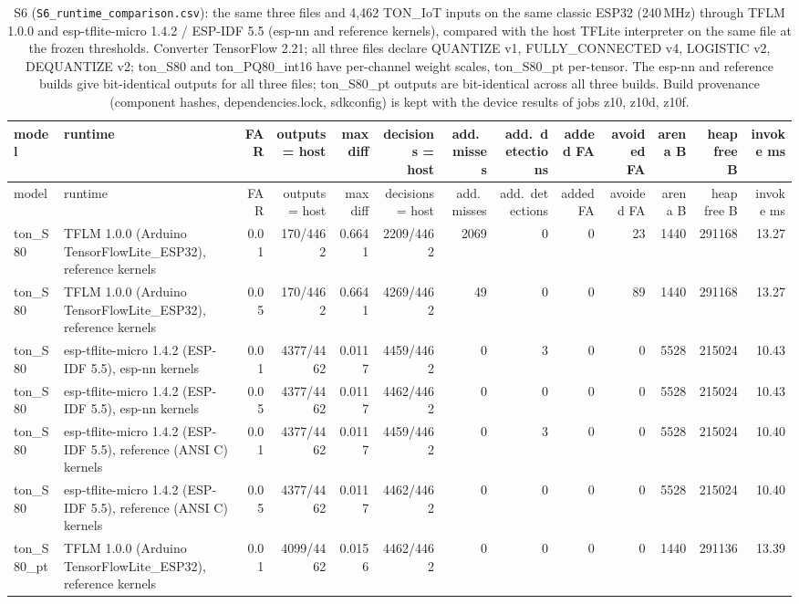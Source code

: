 \documentclass[10pt]{article}
\begin{document}
{\tiny
\begin{longtable}{llrrrrrrrrrrr}
\caption{S6 (\texttt{S6\_runtime\_comparison.csv}): the same three files and 4,462 TON\_IoT inputs on the same classic ESP32 (240\,MHz) through TFLM 1.0.0 and esp-tflite-micro 1.4.2 / ESP-IDF 5.5 (esp-nn and reference kernels), compared with the host TFLite interpreter on the same file at the frozen thresholds. Converter TensorFlow 2.21; all three files declare QUANTIZE v1, FULLY\_CONNECTED v4, LOGISTIC v2, DEQUANTIZE v2; ton\_S80 and ton\_PQ80\_int16 have per-channel weight scales, ton\_S80\_pt per-tensor. The esp-nn and reference builds give bit-identical outputs for all three files; ton\_S80\_pt outputs are bit-identical across all three builds. Build provenance (component hashes, dependencies.lock, sdkconfig) is kept with the device results of jobs z10, z10d, z10f.}\\
\toprule
model & runtime & FAR & outputs = host & max diff & decisions = host & add.\ misses & add.\ detections & added FA & avoided FA & arena B & heap free B & invoke ms \\
\midrule
\endfirsthead
\toprule
model & runtime & FAR & outputs = host & max diff & decisions = host & add.\ misses & add.\ detections & added FA & avoided FA & arena B & heap free B & invoke ms \\
\midrule
\endhead
\bottomrule
\endlastfoot
ton\_S80 & TFLM 1.0.0 (Arduino TensorFlowLite\_ESP32), reference kernels & 0.01 & 170/4462 & 0.6641 & 2209/4462 & 2069 & 0 & 0 & 23 & 1440 & 291168 & 13.27 \\
ton\_S80 & TFLM 1.0.0 (Arduino TensorFlowLite\_ESP32), reference kernels & 0.05 & 170/4462 & 0.6641 & 4269/4462 & 49 & 0 & 0 & 89 & 1440 & 291168 & 13.27 \\
ton\_S80 & esp-tflite-micro 1.4.2 (ESP-IDF 5.5), esp-nn kernels & 0.01 & 4377/4462 & 0.0117 & 4459/4462 & 0 & 3 & 0 & 0 & 5528 & 215024 & 10.43 \\
ton\_S80 & esp-tflite-micro 1.4.2 (ESP-IDF 5.5), esp-nn kernels & 0.05 & 4377/4462 & 0.0117 & 4462/4462 & 0 & 0 & 0 & 0 & 5528 & 215024 & 10.43 \\
ton\_S80 & esp-tflite-micro 1.4.2 (ESP-IDF 5.5), reference (ANSI C) kernels & 0.01 & 4377/4462 & 0.0117 & 4459/4462 & 0 & 3 & 0 & 0 & 5528 & 215024 & 10.40 \\
ton\_S80 & esp-tflite-micro 1.4.2 (ESP-IDF 5.5), reference (ANSI C) kernels & 0.05 & 4377/4462 & 0.0117 & 4462/4462 & 0 & 0 & 0 & 0 & 5528 & 215024 & 10.40 \\
ton\_S80\_pt & TFLM 1.0.0 (Arduino TensorFlowLite\_ESP32), reference kernels & 0.01 & 4099/4462 & 0.0156 & 4462/4462 & 0 & 0 & 0 & 0 & 1440 & 291136 & 13.39 \\

\end{longtable}}
\end{document}
